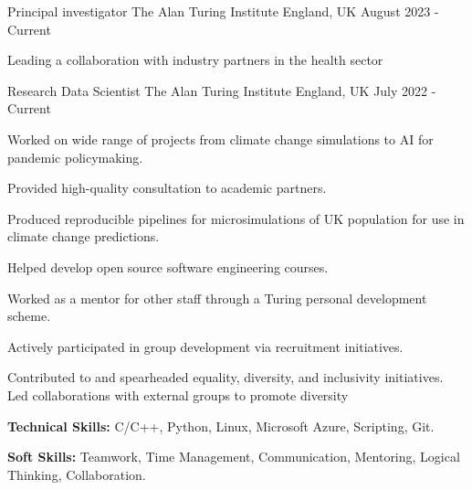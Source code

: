 

\begin{cventries}

  \cventry
    {Principal investigator} %
    {The Alan Turing Institute} %
    {England, UK} %
    {August 2023 - Current} %
    {
      \begin{cvitems} %
        \item {Leading a collaboration with industry partners in the health sector}
      \end{cvitems}
    }

  \cventry
    {Research Data Scientist} %
    {The Alan Turing Institute} %
    {England, UK} %
    {July 2022 - Current} %
    {
      \begin{cvitems} %
        \item {Worked on wide range of projects from climate change simulations to AI for pandemic policymaking.}
        \item {Provided high-quality consultation to academic partners.}
        \item {Produced reproducible pipelines for microsimulations of UK population for use in climate change predictions.}
        \item {Helped develop open source software engineering courses.}
        \item {Worked as a mentor for other staff through a Turing personal development scheme.}
        \item {Actively participated in group development via recruitment initiatives.}
        \item {Contributed to and spearheaded equality, diversity, and inclusivity initiatives. Led collaborations with external groups to promote diversity}
        \item {\textbf{Technical Skills:} C/C++, Python, Linux, Microsoft Azure, Scripting, Git.}
        \item {\textbf{Soft Skills:} Teamwork, Time Management, Communication, Mentoring, Logical Thinking, Collaboration.}
      \end{cvitems}
    }


\end{cventries}
